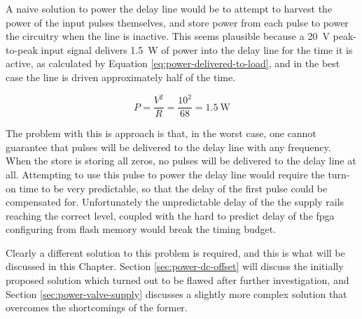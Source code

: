 A naive solution to power the delay line would be to attempt to harvest the power of the input pulses themselves, and store power from each pulse to power the circuitry when the line is inactive. This seems plausible because a \SI{20}{\volt} peak-to-peak input signal delivers \SI{1.5}{\watt} of power into the delay line for the time it is active, as calculated by Equation \ref{eq:power-delivered-to-load}, and in the best case the line is driven approximately half of the time.

\begin{equation}
P = \frac{V^2}{R} = \frac{10^2}{68} = \SI{1.5}{\watt} \label{eq:power-delivered-to-load}
\end{equation}

The problem with this is approach is that, in the worst case, one cannot guarantee that pulses will be delivered to the delay line with any frequency. When the store is storing all zeros, no pulses will be delivered to the delay line at all. Attempting to use this pulse to power the delay line would require the turn-on time to be very predictable, so that the delay of the first pulse could be compensated for. Unfortunately the unpredictable delay of the the supply rails reaching the correct level, coupled with the hard to predict delay of the \gls{fpga} configuring from flash memory would break the timing budget.

Clearly a different solution to this problem is required, and this is what will be discussed in this Chapter. Section \ref{sec:power-dc-offset} will discuss the initially proposed solution which turned out to be flawed after further investigation, and Section \ref{sec:power-valve-supply} discusses a slightly more complex solution that overcomes the shortcomings of the former.

